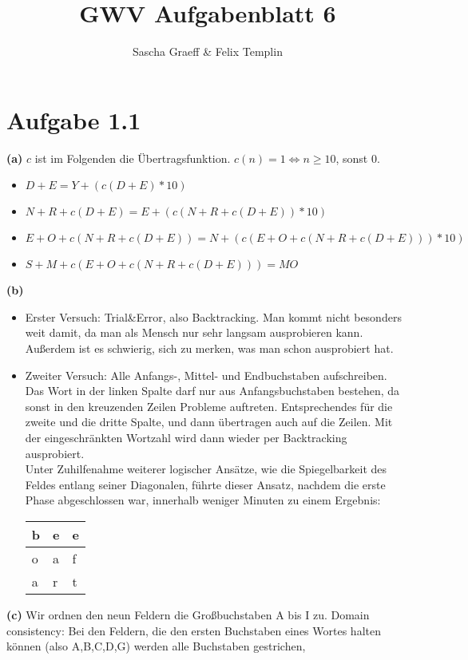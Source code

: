 \documentclass[a4paper,10pt]{article}
\title{GWV Aufgabenblatt 6}
\author{Sascha Graeff \& Felix Templin}
\begin{document}
\maketitle

\section*{Aufgabe 1.1}
\textbf{(a)}
$c$ ist im Folgenden die Übertragsfunktion. $c(n) = 1 \Leftrightarrow n \geq 10$, sonst $0$.
 \begin{itemize}
  \item $D + E = Y + (c(D+E) * 10)$
  \item $N + R + c(D+E) = E + (c(N + R + c(D+E)) * 10)$
  \item $E + O + c(N + R + c(D+E)) = N + (c(E + O + c(N + R + c(D+E))) * 10)$
  \item $S + M + c(E + O + c(N + R + c(D+E))) = MO$
 \end{itemize}
\textbf{(b)}
\begin{itemize}
  \item Erster Versuch: Trial\&Error, also Backtracking. Man kommt nicht besonders weit damit, da man als Mensch nur sehr langsam ausprobieren kann. Außerdem ist es schwierig, sich zu merken, was man schon ausprobiert hat.
  \item Zweiter Versuch: Alle Anfangs-, Mittel- und Endbuchstaben aufschreiben. Das Wort in der linken Spalte darf nur aus Anfangsbuchstaben bestehen, da sonst in den kreuzenden Zeilen Probleme auftreten.
          Entsprechendes für die zweite und die dritte Spalte, und dann übertragen auch auf die Zeilen.
          Mit der eingeschränkten Wortzahl wird dann wieder per Backtracking ausprobiert.\\
          Unter Zuhilfenahme weiterer logischer Ansätze, wie die Spiegelbarkeit des Feldes entlang seiner Diagonalen, führte dieser Ansatz, nachdem die erste Phase abgeschlossen war, innerhalb weniger Minuten zu einem Ergebnis:

\begin{tabular}{ | l | l | l | }
\hline
b & e & e \\ \hline
o & a & f \\ \hline
a & r & t \\ \hline
\end{tabular}
\end{itemize}
\newpage
\noindent \textbf{(c) }
Wir ordnen den neun Feldern die Großbuchstaben A bis I zu.
Domain consistency: Bei den Feldern, die den ersten Buchstaben eines Wortes halten können (also A,B,C,D,G) werden alle Buchstaben gestrichen,
\end{document}
